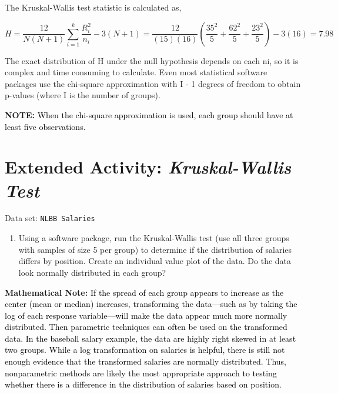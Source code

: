 \documentclass[
]{report}
\providecommand{\tightlist}{%
  \setlength{\itemsep}{0pt}\setlength{\parskip}{0pt}}
\begin{document}
The Kruskal-Wallis test statistic is calculated as,

\begin{equation} 
  H = \frac{12}{N(N + 1)} \sum_{i=1}^k \frac{R_i^2}{n_i} - 3(N + 1) = \frac{12}{(15)(16)}(\frac{35^2}{5}+\frac{62^2}{5}+\frac{23^2}{5}) -3(16) =7.98
  \tag{1.5} \label{eq:1_5}
\end{equation}

The exact distribution of H under the null hypothesis depends on each ni, so it is complex and time consuming to calculate. Even most statistical software packages use the chi-square approximation with I - 1 degrees of freedom to obtain p-values (where I is the number of groups).

\large

\textbf{NOTE:}
\textcolor{black}{When the chi-square approximation is used, each group should have at least five observations.
}

\normalsize

\section*{\texorpdfstring{Extended Activity: \emph{Kruskal-Wallis Test}}{Extended Activity: Kruskal-Wallis Test}}\label{extended-activity-kruskal-wallis-test}

Data set: \texttt{NLBB\ Salaries}

\begin{enumerate}
\def\labelenumi{\arabic{enumi}.}
\setcounter{enumi}{27}
\tightlist
\item
  Using a software package, run the Kruskal-Wallis test (use all three groups with samples of size 5 per group) to determine if the distribution of salaries differs by position. Create an individual value plot of the data. Do the data look normally distributed in each group?
\end{enumerate}

\large

\textbf{Mathematical Note:}
\textcolor{black}{If the spread of each group appears to increase as the center (mean or median) increases, transforming the data—such as by taking the log of each response variable—will make the data appear much more normally distributed. Then parametric techniques can often be used on the transformed data. In the baseball salary
example, the data are highly right skewed in at least two groups. While a log transformation on salaries is helpful, there is still not enough evidence that the transformed salaries are normally distributed. Thus, nonparametric methods are likely the most appropriate approach to testing whether there is a difference in the distribution of salaries based on position.
}
\end{document}
